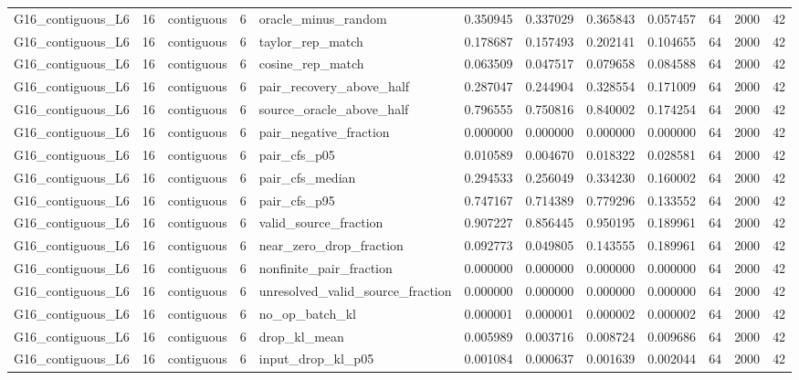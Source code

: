\begin{tabular}{lrlrlrrrrrrr}
G16_contiguous_L6 & 16 & contiguous & 6 & oracle_minus_random & 0.350945 & 0.337029 & 0.365843 & 0.057457 & 64 & 2000 & 42 \\
G16_contiguous_L6 & 16 & contiguous & 6 & taylor_rep_match & 0.178687 & 0.157493 & 0.202141 & 0.104655 & 64 & 2000 & 42 \\
G16_contiguous_L6 & 16 & contiguous & 6 & cosine_rep_match & 0.063509 & 0.047517 & 0.079658 & 0.084588 & 64 & 2000 & 42 \\
G16_contiguous_L6 & 16 & contiguous & 6 & pair_recovery_above_half & 0.287047 & 0.244904 & 0.328554 & 0.171009 & 64 & 2000 & 42 \\
G16_contiguous_L6 & 16 & contiguous & 6 & source_oracle_above_half & 0.796555 & 0.750816 & 0.840002 & 0.174254 & 64 & 2000 & 42 \\
G16_contiguous_L6 & 16 & contiguous & 6 & pair_negative_fraction & 0.000000 & 0.000000 & 0.000000 & 0.000000 & 64 & 2000 & 42 \\
G16_contiguous_L6 & 16 & contiguous & 6 & pair_cfs_p05 & 0.010589 & 0.004670 & 0.018322 & 0.028581 & 64 & 2000 & 42 \\
G16_contiguous_L6 & 16 & contiguous & 6 & pair_cfs_median & 0.294533 & 0.256049 & 0.334230 & 0.160002 & 64 & 2000 & 42 \\
G16_contiguous_L6 & 16 & contiguous & 6 & pair_cfs_p95 & 0.747167 & 0.714389 & 0.779296 & 0.133552 & 64 & 2000 & 42 \\
G16_contiguous_L6 & 16 & contiguous & 6 & valid_source_fraction & 0.907227 & 0.856445 & 0.950195 & 0.189961 & 64 & 2000 & 42 \\
G16_contiguous_L6 & 16 & contiguous & 6 & near_zero_drop_fraction & 0.092773 & 0.049805 & 0.143555 & 0.189961 & 64 & 2000 & 42 \\
G16_contiguous_L6 & 16 & contiguous & 6 & nonfinite_pair_fraction & 0.000000 & 0.000000 & 0.000000 & 0.000000 & 64 & 2000 & 42 \\
G16_contiguous_L6 & 16 & contiguous & 6 & unresolved_valid_source_fraction & 0.000000 & 0.000000 & 0.000000 & 0.000000 & 64 & 2000 & 42 \\
G16_contiguous_L6 & 16 & contiguous & 6 & no_op_batch_kl & 0.000001 & 0.000001 & 0.000002 & 0.000002 & 64 & 2000 & 42 \\
G16_contiguous_L6 & 16 & contiguous & 6 & drop_kl_mean & 0.005989 & 0.003716 & 0.008724 & 0.009686 & 64 & 2000 & 42 \\
G16_contiguous_L6 & 16 & contiguous & 6 & input_drop_kl_p05 & 0.001084 & 0.000637 & 0.001639 & 0.002044 & 64 & 2000 & 42 \\

\end{tabular}

